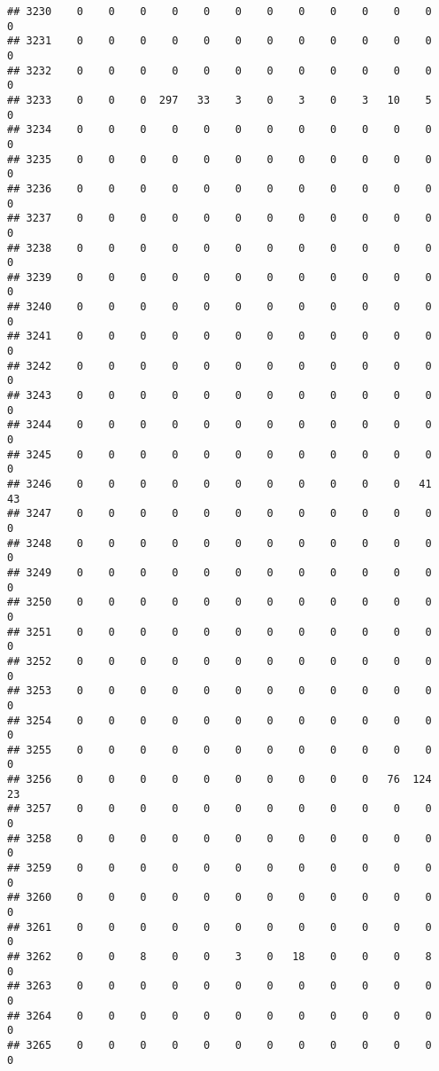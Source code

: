 \documentclass[]{article}
\begin{document}
\begin{verbatim}
## 3230    0    0    0    0    0    0    0    0    0    0    0    0    0
## 3231    0    0    0    0    0    0    0    0    0    0    0    0    0
## 3232    0    0    0    0    0    0    0    0    0    0    0    0    0
## 3233    0    0    0  297   33    3    0    3    0    3   10    5    0
## 3234    0    0    0    0    0    0    0    0    0    0    0    0    0
## 3235    0    0    0    0    0    0    0    0    0    0    0    0    0
## 3236    0    0    0    0    0    0    0    0    0    0    0    0    0
## 3237    0    0    0    0    0    0    0    0    0    0    0    0    0
## 3238    0    0    0    0    0    0    0    0    0    0    0    0    0
## 3239    0    0    0    0    0    0    0    0    0    0    0    0    0
## 3240    0    0    0    0    0    0    0    0    0    0    0    0    0
## 3241    0    0    0    0    0    0    0    0    0    0    0    0    0
## 3242    0    0    0    0    0    0    0    0    0    0    0    0    0
## 3243    0    0    0    0    0    0    0    0    0    0    0    0    0
## 3244    0    0    0    0    0    0    0    0    0    0    0    0    0
## 3245    0    0    0    0    0    0    0    0    0    0    0    0    0
## 3246    0    0    0    0    0    0    0    0    0    0    0   41   43
## 3247    0    0    0    0    0    0    0    0    0    0    0    0    0
## 3248    0    0    0    0    0    0    0    0    0    0    0    0    0
## 3249    0    0    0    0    0    0    0    0    0    0    0    0    0
## 3250    0    0    0    0    0    0    0    0    0    0    0    0    0
## 3251    0    0    0    0    0    0    0    0    0    0    0    0    0
## 3252    0    0    0    0    0    0    0    0    0    0    0    0    0
## 3253    0    0    0    0    0    0    0    0    0    0    0    0    0
## 3254    0    0    0    0    0    0    0    0    0    0    0    0    0
## 3255    0    0    0    0    0    0    0    0    0    0    0    0    0
## 3256    0    0    0    0    0    0    0    0    0    0   76  124   23
## 3257    0    0    0    0    0    0    0    0    0    0    0    0    0
## 3258    0    0    0    0    0    0    0    0    0    0    0    0    0
## 3259    0    0    0    0    0    0    0    0    0    0    0    0    0
## 3260    0    0    0    0    0    0    0    0    0    0    0    0    0
## 3261    0    0    0    0    0    0    0    0    0    0    0    0    0
## 3262    0    0    8    0    0    3    0   18    0    0    0    8    0
## 3263    0    0    0    0    0    0    0    0    0    0    0    0    0
## 3264    0    0    0    0    0    0    0    0    0    0    0    0    0
## 3265    0    0    0    0    0    0    0    0    0    0    0    0    0

\end{verbatim}
\end{document}
